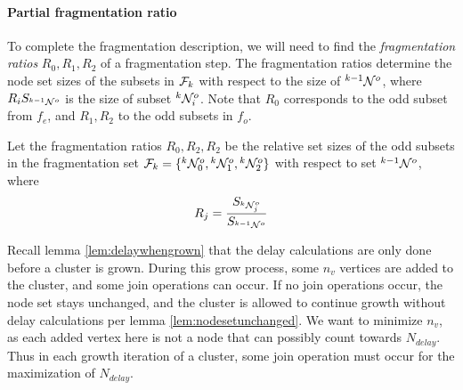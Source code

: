 %
%

\paragraph{Partial fragmentation ratio}
To complete the fragmentation description, we will need to find the \emph{fragmentation ratios} $R_0, R_1, R_2$ of a fragmentation step. The fragmentation ratios determine the node set sizes of the subsets in $\mathcal{F}_{k}$ with respect to the size of ${}^{k-1}\mathcal{N}^o$, where $R_i S_{{}^{k-1}\mathcal{N}^o}$ is the size of subset ${}^{k}\mathcal{N}^o_i$. Note that $R_0$ corresponds to the odd subset from $f_e$, and $R_1, R_2$ to the odd subsets in $f_o$.

\begin{lemma}\label{lem:fragratio}
  Let the fragmentation ratios $R_0, R_2, R_2$ be the relative set sizes of the odd subsets in the fragmentation set $\mathcal{F}_{k} = \{{}^{k}\mathcal{N}^o_0, {}^{k}\mathcal{N}^{o}_1, {}^{k}\mathcal{N}^{o}_2 \}$ with respect to set ${}^{k-1}\mathcal{N}^o$, where
  \begin{equation}\label{eq:fragratio}
    R_j = \frac{S_{{}^{k}\mathcal{N}^o_j}}{S_{{}^{k-1}\mathcal{N}^o}}
  \end{equation}
\end{lemma}

Recall lemma \ref{lem:delaywhengrown} that the delay calculations are only done before a cluster is grown. During this grow process, some $n_v$ vertices are added to the cluster, and some join operations can occur. If no join operations occur, the node set stays unchanged, and the cluster is allowed to continue growth without delay calculations per lemma \ref{lem:nodesetunchanged}. We want to minimize $n_v$, as each added vertex here is not a node that can possibly count towards $N_{delay}$. Thus in each growth iteration of a cluster, some join operation must occur for the maximization of $N_{delay}$.

